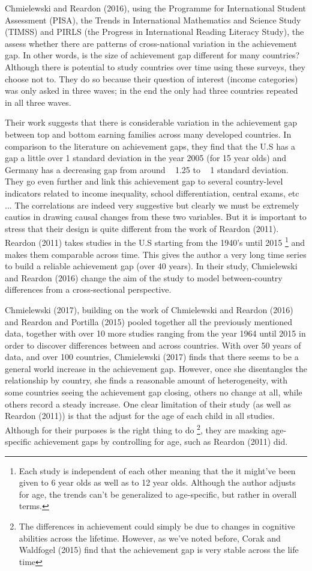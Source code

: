\documentclass[11pt, a4paper]{article}\usepackage[]{graphicx}\usepackage[]{color}
\begin{document}
Chmielewski and Reardon (2016), using the Programme for International Student Assessment (PISA), the Trends in International Mathematics and Science Study (TIMSS) and PIRLS (the Progress in International Reading Literacy Study), the assess whether there are patterns of cross-national variation in the achievement gap. In other words, is the size of achievement gap different for many countries? Although there is potential to study countries over time using these surveys, they choose not to. They do so because their question of interest (income categories) was only asked in three waves; in the end the only had three countries repeated in all three waves. 

Their work suggests that there is considerable variation in the achievement gap between top and bottom earning families across many developed countries. In comparison to the literature on achievement gaps, they find that the U.S has a gap a little over 1 standard deviation in the year 2005 (for 15 year olds) and Germany has a decreasing gap from around ~ 1.25 to ~ 1 standard deviation. They go even further and link this achievement gap to several country-level indicators related to income inequality, school differentiation, central exams, etc ... The correlations are indeed very suggestive but clearly we must be extremely cautios in drawing causal changes from these two variables. But it is important to stress that their design is quite different from the work of Reardon (2011). Reardon (2011) takes studies in the U.S starting from the 1940's until 2015 \footnote{Each study is independent of each other meaning that the it might've been given to 6 year olds as well as to 12 year olds. Although the author adjusts for age, the trends can't be generalized to age-specific, but rather in overall terms.} and makes them comparable across time. This gives the author a very long time series to build a reliable achievement gap (over 40 years). In their study, Chmielewski and Reardon (2016) change the aim of the study to model between-country differences from a cross-sectional perspective.

Chmielewski (2017), building on the work of Chmielewski and Reardon (2016) and Reardon and Portilla (2015) pooled together all the previously mentioned data, together with over 10 more studies ranging from the year 1964 until 2015 in order to discover differences between and across countries. With over 50 years of data, and over 100 countries, Chmielewski (2017) finds that there seems to be a general world increase in the achievement gap. However, once she disentangles the relationship by country, she finds a reasonable amount of heterogeneity, with some countries seeing the achievement gap closing, others no change at all, while others record a steady increase. One clear limitation of their study (as well as Reardon (2011)) is that the adjust for the age of each child in all studies. Although for their purposes is the right thing to do \footnote{The differences in achievement could simply be due to changes in cognitive abilities across the lifetime. However, as we've noted before, Corak and Waldfogel (2015) find that the achievement gap is very stable across the life time}, they are masking age-specific achievement gaps by controlling for age, such as Reardon (2011) did.
\end{document}
